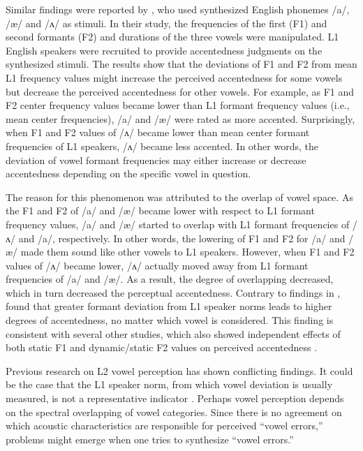 Similar findings were reported by \citet{Chan_2016}, who used synthesized English phonemes /a/, /æ/ and /ʌ/ as stimuli. In their study, the frequencies of the first (F1) and second formants (F2) and durations of the three vowels were manipulated. L1 English speakers were recruited to provide accentedness judgments on the synthesized stimuli. The results show that the deviations of F1 and F2 from mean L1 frequency values might increase the perceived accentedness for some vowels but decrease the perceived accentedness for other vowels. For example, as F1 and F2 center frequency values became lower than L1 formant frequency values (i.e., mean center frequencies), /a/ and /æ/ were rated as more accented. Surprisingly, when F1 and F2 values of /ʌ/ became lower than mean center formant frequencies of L1 speakers, /ʌ/ became less accented. In other words, the deviation of vowel formant frequencies may either increase or decrease accentedness depending on the specific vowel in question. 

The reason for this phenomenon was attributed to the overlap of vowel space. As the F1 and F2 of /a/ and /æ/ became lower with respect to L1 formant frequency values, /a/ and /æ/ started to overlap with L1 formant frequencies of /ʌ/ and /a/, respectively. In other words, the lowering of F1 and F2 for /a/ and /æ/ made them sound like other vowels to L1 speakers. However, when F1 and F2 values of /ʌ/ became lower, /ʌ/ actually moved away from L1 formant frequencies of /a/ and /æ/. As a result, the degree of overlapping decreased, which in turn decreased the perceptual accentedness. Contrary to findings in \citet{Chan_2016, Major_1987}, \citet{McCullough_2013} found that greater formant deviation from L1 speaker norms leads to higher degrees of accentedness, no matter which vowel is considered. This finding is consistent with several other studies, which also showed independent effects of both static F1 and dynamic/static F2 values on perceived accentedness \citep{Munro_1993, Wayland_1997}. 

Previous research on L2 vowel perception has shown conflicting findings. It could be the case that the L1 speaker norm, from which vowel deviation is usually measured, is not a representative indicator \citep{Chan_2016}. Perhaps vowel perception depends on the spectral overlapping of vowel categories. Since there is no agreement on which acoustic characteristics are responsible for perceived “vowel errors,” problems might emerge when one tries to synthesize “vowel errors.”

